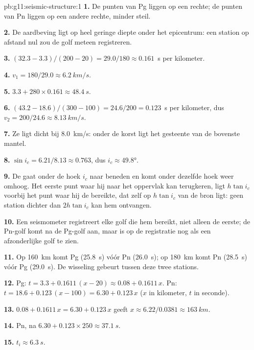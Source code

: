 \begin{solution}{pb:g11:seismic-structure:1}
\textbf{1.} De punten van Pg liggen op een rechte; de punten van Pn liggen op
een andere rechte, minder steil.

\textbf{2.} De aardbeving ligt op heel geringe diepte onder het epicentrum: een
station op afstand nul zou de golf meteen registreren.

\textbf{3.} $(32.3 - 3.3)/(200 - 20) = 29.0/180 \approx \num{0.161}$~\unit{s}
per kilometer.

\textbf{4.} $v_1 = 180/29.0 \approx \qty{6.2}{km/s}$.

\textbf{5.} $3.3 + 280 \times 0.161 \approx \qty{48.4}{s}$.

\textbf{6.} $(43.2 - 18.6)/(300 - 100) = 24.6/200 = \num{0.123}$~\unit{s}
per kilometer, dus $v_2 = 200/24.6 \approx \qty{8.13}{km/s}$.

\textbf{7.} Ze ligt dicht bij \qty{8.0}{km/s}: onder de korst ligt het gesteente
van de bovenste mantel.

\textbf{8.} $\sin i_c = 6.21/8.13 \approx 0.763$, dus $i_c \approx
\ang{49.8}$.

\textbf{9.} De  gaat onder de hoek $i_c$ naar beneden en komt onder
dezelfde hoek weer omhoog. Het eerste punt waar hij naar het oppervlak kan
terugkeren, ligt $h\tan i_c$ voorbij het punt waar hij de  bereikte, dat zelf
op $h\tan i_c$ van de bron ligt: geen station dichter dan $2h\tan i_c$ kan hem
ontvangen.

\textbf{10.} Een seismometer registreert elke golf die hem bereikt, niet alleen
de eerste; de Pn-golf komt na de Pg-golf aan, maar is op de registratie nog als
een afzonderlijke golf te zien.

\textbf{11.} Op \qty{160}{km} komt Pg (\qty{25.8}{s}) vóór Pn
(\qty{26.0}{s}); op \qty{180}{km} komt Pn (\qty{28.5}{s}) vóór Pg
(\qty{29.0}{s}). De wisseling gebeurt tussen deze twee stations.

\textbf{12.} Pg: $t = 3.3 + 0.1611\,(x - 20) \approx 0.08 + 0.1611\,x$. Pn:
$t = 18.6 + 0.123\,(x - 100) = 6.30 + 0.123\,x$ ($x$ in kilometer, $t$ in
seconde).

\textbf{13.} $0.08 + 0.1611\,x = 6.30 + 0.123\,x$ geeft $x \approx
6.22/0.0381 \approx \qty{163}{km}$.

\textbf{14.} Pn, na $6.30 + 0.123 \times 250 \approx \qty{37.1}{s}$.

\textbf{15.} $t_i \approx \qty{6.3}{s}$.


\end{solution}
